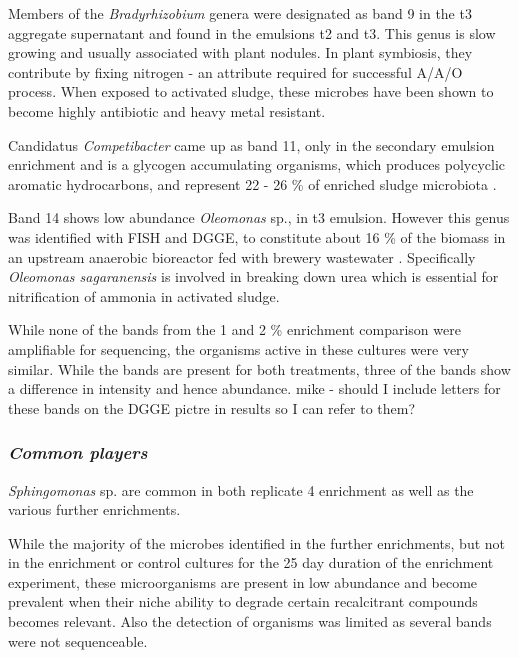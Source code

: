 \documentclass[11pt]{article}
\begin{document}
Members of the \emph{Bradyrhizobium} genera were designated as band 9 in the t3 aggregate supernatant and found in the emulsions t2 and t3. This genus is slow growing \cite{rebah2002wastewater} and usually associated with plant nodules. In plant symbiosis, they contribute by fixing nitrogen - an attribute required for successful A/A/O process. When exposed to activated sludge, these microbes have been shown to become highly antibiotic and heavy metal resistant.


Candidatus \emph{Competibacter} came up as band 11, only in the secondary emulsion enrichment and is a glycogen accumulating organisms, which produces polycyclic aromatic hydrocarbons, and represent 22 - 26 \% of enriched sludge microbiota \cite{bengtsson2008production,lemaire2008microbial}. 


Band 14 shows low abundance \emph{Oleomonas} sp., in t3 emulsion. However this genus was identified with FISH and DGGE, to constitute about 16 \% of the biomass in an upstream anaerobic bioreactor fed with brewery wastewater \cite{fernandez2008analysis}. Specifically \emph{Oleomonas sagaranensis} is involved in breaking down urea \cite{kanamori2005allophanate,kanamori2004enzymatic} which is essential for nitrification of ammonia in activated sludge.


While none of the bands from the 1 and 2 \% enrichment comparison were amplifiable for sequencing, the organisms active in these cultures were very similar. While the bands are present for both treatments, three of the bands show a difference in intensity and hence abundance.
mike - should I include letters for these bands on the DGGE pictre in results so I can refer to them?

\subsubsection{\emph{Common players}}
\emph{Sphingomonas} sp. are common in both replicate 4 enrichment as well as the various further enrichments.


While the majority of the microbes identified in the further enrichments, but not in the enrichment or control cultures for the 25 day duration of the enrichment experiment, these microorganisms are present in low abundance and become prevalent when their niche ability to degrade certain recalcitrant compounds becomes relevant. Also the detection of organisms was limited as several bands were not sequenceable.
\end{document}
